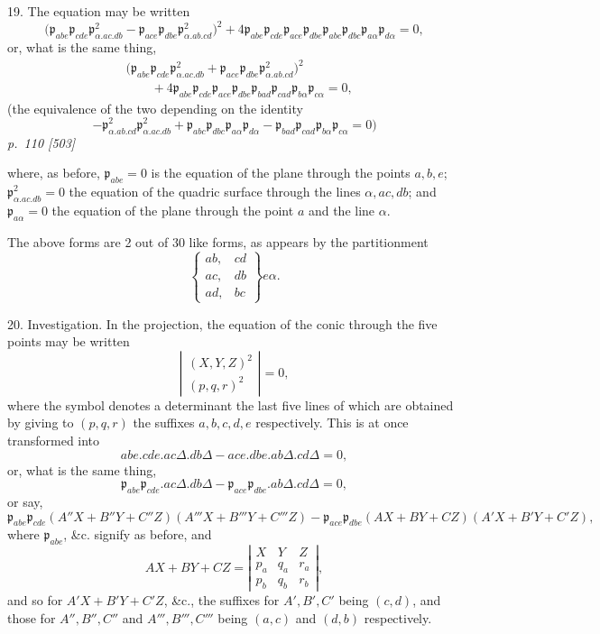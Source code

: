 \documentclass[11pt,a4paper]{article}
\newcommand{\sourcepage}[2]{%
  \bigskip
  \noindent\textit{p.~#1 [#2]}%
  \par\smallskip
}
\newcommand{\Det}[1]{\left|\begin{matrix}#1\end{matrix}\right|}
\newcommand{\p}{\mathfrak p}
\begin{document}
19. The equation may be written
\[
\bigl(\p_{abe}\p_{cde}\p^2_{\alpha.ac.db}
-\p_{ace}\p_{dbe}\p^2_{\alpha.ab.cd}\bigr)^2
+4\p_{abe}\p_{cde}\p_{ace}\p_{dbe}\p_{abc}\p_{dbc}\p_{a\alpha}\p_{d\alpha}=0,
\]
or, what is the same thing,
\[
\begin{aligned}
&\bigl(\p_{abe}\p_{cde}\p^2_{\alpha.ac.db}
+\p_{ace}\p_{dbe}\p^2_{\alpha.ab.cd}\bigr)^2\\
&\qquad+4\p_{abe}\p_{cde}\p_{ace}\p_{dbe}\p_{bad}\p_{cad}\p_{b\alpha}\p_{c\alpha}=0,
\end{aligned}
\]
(the equivalence of the two depending on the identity
\[
-\p^2_{\alpha.ab.cd}\p^2_{\alpha.ac.db}
+\p_{abc}\p_{dbc}\p_{a\alpha}\p_{d\alpha}
-\p_{bad}\p_{cad}\p_{b\alpha}\p_{c\alpha}=0)
\]
\sourcepage{110}{503}
where, as before, $\p_{abe}=0$ is the equation of the plane through the points
$a,b,e$; $\p^2_{\alpha.ac.db}=0$ the equation of the quadric surface through the
lines $\alpha,ac,db$; and $\p_{a\alpha}=0$ the equation of the plane through the
point $a$ and the line $\alpha$.

The above forms are 2 out of 30 like forms, as appears by the partitionment
\[
\left\{
\begin{matrix}
ab,&cd\\
ac,&db\\
ad,&bc
\end{matrix}
\right\}e\alpha.
\]

20. Investigation. In the projection, the equation of the conic through the five
points may be written
\[
\left|\begin{array}{c}
(X,Y,Z)^2\\
(p,q,r)^2
\end{array}\right|=0,
\]
where the symbol denotes a determinant the last five lines of which are obtained by
giving to $(p,q,r)$ the suffixes $a,b,c,d,e$ respectively. This is at once transformed
into
\[
abe.cde.ac\Delta.db\Delta-ace.dbe.ab\Delta.cd\Delta=0,
\]
or, what is the same thing,
\[
\p_{abe}\p_{cde}.ac\Delta.db\Delta-\p_{ace}\p_{dbe}.ab\Delta.cd\Delta=0,
\]
or say,
\[
\p_{abe}\p_{cde}(A''X+B''Y+C''Z)(A'''X+B'''Y+C'''Z)
-\p_{ace}\p_{dbe}(AX+BY+CZ)(A'X+B'Y+C'Z),
\]
where $\p_{abe}$, \&c. signify as before, and
\[
AX+BY+CZ=\Det{X&Y&Z\\p_a&q_a&r_a\\p_b&q_b&r_b},
\]
and so for $A'X+B'Y+C'Z$, \&c., the suffixes for $A',B',C'$ being $(c,d)$, and
those for $A'',B'',C''$ and $A''',B''',C'''$ being $(a,c)$ and $(d,b)$ respectively.
\end{document}
